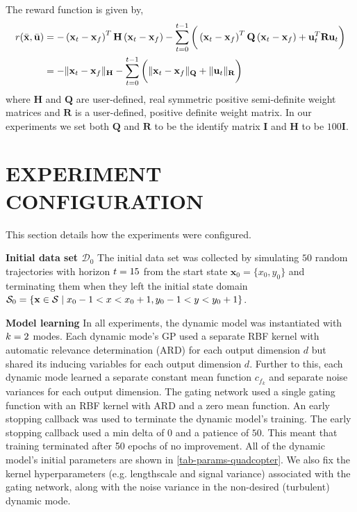 \documentclass[twoside]{article}
\newcommand{\modeInd}{\ensuremath{k}}
\newcommand{\ModeInd}{\ensuremath{\MakeUppercase{\modeInd}}}
\newcommand{\state}{\ensuremath{\mathbf{x}}}
\newcommand{\control}{\ensuremath{\mathbf{u}}}
\newcommand{\dataset}{\ensuremath{\mathcal{D}}}
\newcommand{\latentFunc}{\ensuremath{f}}
\begin{document}
The reward function is given by,
\begin{align} \label{eq-reward-func}
\rewardFunc(\bar{\state}, \bar{\action}) &=
-\left(\state_{\TimeInd} - \targetState \right)^{T}\mathbf{H} \left(\state_{\TimeInd}-\targetState \right)
- \sum_{\timeInd=0}^{\TimeInd-1} \bigg(
\left(\state_{\timeInd} - \targetState \right)^{T}\mathbf{Q} \left(\state_{\timeInd}-\targetState \right)
+\action_{\timeInd}^{T} \mathbf{R} \action_{\timeInd} \bigg)
\\
&=
- \|{\state_{\TimeInd}} - \targetState \|_{\mathbf{H}}
- \sum_{\timeInd=0}^{\TimeInd-1} \bigg( \|{\state_{\timeInd}} - \targetState \|_{\mathbf{Q}}
+ \|\control_{\timeInd} \|_{\mathbf{R}} \bigg)
\end{align}
where \(\mathbf{H}\) and \(\mathbf{Q}\) are user-defined, real symmetric positive semi-definite
weight matrices and \(\mathbf{R}\) is a user-defined, positive definite weight matrix.
In our experiments we set both \(\mathbf{Q}\) and \(\mathbf{R}\) to be the identify matrix \(\mathbf{I}\) and
\(\mathbf{H}\) to be \(100\mathbf{I}\).

\section{EXPERIMENT CONFIGURATION \label{sec-experiment-configuration}}
\label{sec:orgc2b5a12}
This section details how the experiments were configured.

\textbf{Initial data set \(\dataset_0\)}
The initial data set was collected by simulating \(50\) random trajectories with horizon \(\relax{\ensuremath{t}}=15\) from
the start state \(\state_0 = \{x_{0}, y_{0}\}\) and
terminating them when they left the initial state domain \(\initialStateDomain = \{\state \in \stateDomain \mid x_{0}-1 < x < x_{0}+1, y_{0}-1 < y < y_{0}+1 \}\).

\textbf{Model learning}
In all experiments, the dynamic model was instantiated with \(\ModeInd=2\) modes.
Each dynamic mode's GP used a separate RBF kernel with automatic relevance determination (ARD) for each output dimension \(d\) but
shared its inducing variables for each output dimension \(d\).
Further to this, each dynamic mode learned a separate constant mean function \(c_{\latentFunc_{\modeInd}}\) and separate noise variances for each output dimension.
The gating network used a single gating function with an RBF kernel with ARD and a zero mean function.
An early stopping callback was used to terminate the dynamic model's training.
The early stopping callback used a min delta of \(0\) and a patience of \(50\).
This meant that training terminated after 50 epochs of no improvement.
All of the dynamic model's initial parameters are shown in \cref{tab-params-quadcopter}.
We also fix the kernel hyperparameters (e.g. lengthscale and signal variance) associated with the gating network, along with
the noise variance in the non-desired (turbulent) dynamic mode.
\end{document}

